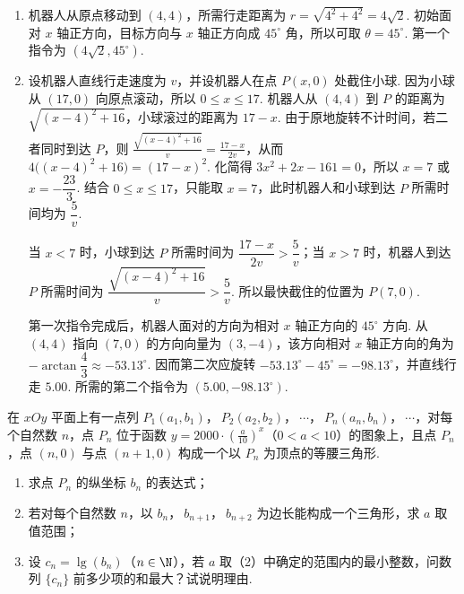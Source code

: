 \begin{solution}
\begin{enumerate}
\item 机器人从原点移动到 \((4,4)\)，所需行走距离为 \(r=\sqrt{4^2+4^2}=4\sqrt{2}\). 初始面对 \(x\) 轴正方向，目标方向与 \(x\) 轴正方向成 \(45^{\circ}\) 角，所以可取 \(\theta=45^{\circ}\). 第一个指令为 \((4\sqrt{2},45^{\circ})\).
\item 设机器人直线行走速度为 \(v\)，并设机器人在点 \(P(x,0)\) 处截住小球. 因为小球从 \((17,0)\) 向原点滚动，所以 \(0\leqslant x\leqslant17\). 机器人从 \((4,4)\) 到 \(P\) 的距离为 \(\sqrt{(x-4)^2+16}\)，小球滚过的距离为 \(17-x\). 由于原地旋转不计时间，若二者同时到达 \(P\)，则
\(\frac{\sqrt{(x-4)^2+16}}{v}=\frac{17-x}{2v}\)，从而 \(4\bigl((x-4)^2+16\bigr)=(17-x)^2\).
化简得 \(3x^2+2x-161=0\)，所以 \(x=7\) 或 \(x=-\dfrac{23}{3}\). 结合 \(0\leqslant x\leqslant17\)，只能取 \(x=7\)，此时机器人和小球到达 \(P\) 所需时间均为 \(\dfrac{5}{v}\).

当 \(x<7\) 时，小球到达 \(P\) 所需时间为 \(\dfrac{17-x}{2v}>\dfrac{5}{v}\)；当 \(x>7\) 时，机器人到达 \(P\) 所需时间为 \(\dfrac{\sqrt{(x-4)^2+16}}{v}>\dfrac{5}{v}\). 所以最快截住的位置为 \(P(7,0)\).

第一次指令完成后，机器人面对的方向为相对 \(x\) 轴正方向的 \(45^{\circ}\) 方向. 从 \((4,4)\) 指向 \((7,0)\) 的方向向量为 \((3,-4)\)，该方向相对 \(x\) 轴正方向的角为 \(-\arctan\dfrac43\approx-53.13^{\circ}\). 因而第二次应旋转 \(-53.13^{\circ}-45^{\circ}=-98.13^{\circ}\)，并直线行走 \(5.00\). 所需的第二个指令为 \((5.00,-98.13^{\circ})\).
\end{enumerate}
\end{solution}

\begin{problem}
在 \(xOy\) 平面上有一点列 \(P_1(a_1,b_1)\)，\(\ P_2(a_2,b_2)\)，\(\ \cdots\)，\(\ P_n(a_n,b_n)\)，\(\ \cdots\)，对每个自然数 \(n\)，点 \(P_n\) 位于函数 \(y=2000\cdot \left(\frac{a}{10}\right)^x\)（\(0<a<10\)）的图象上，且点 \(P_n\)，点 \((n,0)\) 与点 \((n+1,0)\) 构成一个以 \(P_n\) 为顶点的等腰三角形.
\begin{enumerate}
\item 求点 \(P_n\) 的纵坐标 \(b_n\) 的表达式；
\item 若对每个自然数 \(n\)，以 \(b_n\)，\(\ b_{n+1}\)，\(\ b_{n+2}\) 为边长能构成一个三角形，求 \(a\) 取值范围；
\item 设 \(c_n=\lg(b_n)\)（\(n\in\N\)），若 \(a\) 取（2）中确定的范围内的最小整数，问数列 \(\{c_n\}\) 前多少项的和最大？试说明理由.
\end{enumerate}
\end{problem}

